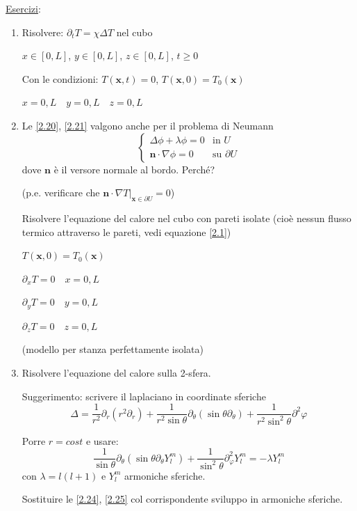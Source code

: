 \documentclass[a4paper,11pt]{report}
\newcommand{\vect}[1]{\boldsymbol{#1}}
\newcommand{\x}{\boldsymbol{x}}
\begin{document}
\begin{samepage}
\underline{Esercizi}:
\begin{enumerate}[label=(\roman*)]

\item Risolvere: $\partial_t T=\chi\Delta T$ nel cubo

$x\in[0,L]$, $y\in[0,L]$, $z\in[0,L]$, $t\geq 0$

Con le condizioni: $T(\x,t)=0$, $T(\x,0)=T_0(\x)$

$x=0,L \quad y=0,L \quad z=0,L $

\item Le \eqref{2.20}, \eqref{2.21} valgono anche per il problema di Neumann 
\[
\begin{cases}
\Delta\phi + \lambda\phi =0 & \text{in }U\\
\vect{n}\cdot \nabla\phi=0 & \text{su }\partial U
\end{cases}
\]
dove $\vect{n}$ \`e il versore normale al bordo. Perch\'e? 

(p.e. verificare che $\vect{n}\cdot\nabla T\big|_{\x\in \partial U}=0$)

Risolvere l'equazione del calore nel cubo con pareti isolate (cio\`e nessun flusso termico attraverso le pareti, vedi equazione \eqref{2.1})

$T(\x,0)=T_0(\x)$

$\partial_x T=0 \quad x=0,L$

$\partial_y T=0 \quad y=0,L$

$\partial_z T=0 \quad z=0,L$

(modello per stanza perfettamente isolata)

\item Risolvere l'equazione del calore sulla 2-sfera. 
 
Suggerimento: scrivere il laplaciano in coordinate sferiche
\begin{equation}
\Delta =\frac{1}{r^2}\partial_r(r^2\partial_r)+\frac{1}{r^2\sin\theta}\partial_{\theta} (\sin\theta\partial_{\theta})+\frac{1}{r^2\sin^2\theta}\partial^2\varphi
\end{equation}

Porre $r=cost$ e usare:
\begin{equation}
\frac{1}{\sin\theta}\partial_{\theta}(\sin\theta\partial_\theta Y^m_l)+\frac{1}{\sin^2\theta}\partial^2_{\varphi}Y_l^m=-\lambda Y_l^m
\end{equation}
con $\lambda=l(l+1)$ e $Y_l^m$ armoniche sferiche. 

Sostituire le \eqref{2.24}, \eqref{2.25} col corrispondente sviluppo in armoniche sferiche.
\end{enumerate}
\end{samepage}
\end{document}
